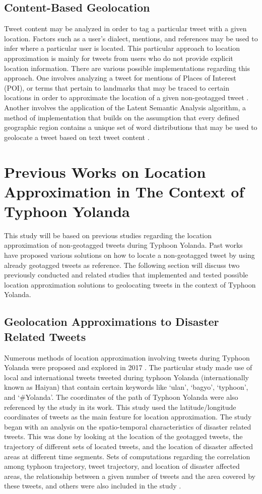 \subsection{Content-Based Geolocation}
Tweet content may be analyzed in order to tag a particular tweet with a given location. Factors such as a user’s dialect, mentions, and references may be used to infer where a particular user is located. This particular approach to location approximation is mainly for tweets from users who do not provide explicit location information. There are various possible implementations regarding this approach. One involves analyzing a tweet for mentions of Places of Interest (POI), or terms that pertain to landmarks that may be traced to certain locations in order to approximate the location of a given non-geotagged tweet \cite{L22014, CHENGCAVARLEELEE2010}.  Another involves the application of the Latent Semantic Analysis algorithm, a method of implementation that builds on the assumption that every defined geographic region contains a unique set of word distributions that may be used to geolocate a tweet based on text tweet content \cite{ROSALES2017, VELASCOBERMEJODOMINGO2018}.

\section {Previous Works on Location Approximation in The Context of Typhoon Yolanda }
This study will be based on previous studies regarding the location approximation of non-geotagged tweets during Typhoon Yolanda. Past works have proposed various solutions on how to locate a non-geotagged tweet by using already geotagged tweets as reference. The following section will discuss two previously conducted and related studies that implemented and tested possible location approximation solutions to geolocating tweets in the context of Typhoon Yolanda.

\subsection{Geolocation Approximations to Disaster Related Tweets}
Numerous methods of location approximation involving tweets during Typhoon Yolanda were proposed and explored in 2017 \cite{ROSALES2017}. The particular study made use of local and international tweets tweeted during typhoon Yolanda (internationally known as Haiyan) that contain certain keywords like ‘ulan’, ‘bagyo’, ‘typhoon’, and ‘#Yolanda’. The coordinates of the path of Typhoon Yolanda were also referenced by the study in its work. This study used the latitude/longitude coordinates of tweets as the main feature for location approximation. The study began with an analysis on the spatio-temporal characteristics of disaster related tweets. This was done by looking at the location of the geotagged tweets, the trajectory of different sets of located tweets, and the location of disaster affected areas at different time segments. Sets of computations regarding the correlation among typhoon trajectory, tweet trajectory, and location of disaster affected areas, the relationship between a given number of tweets and the area covered by these tweets, and others were also included in the study \cite{ROSALES2017}.

